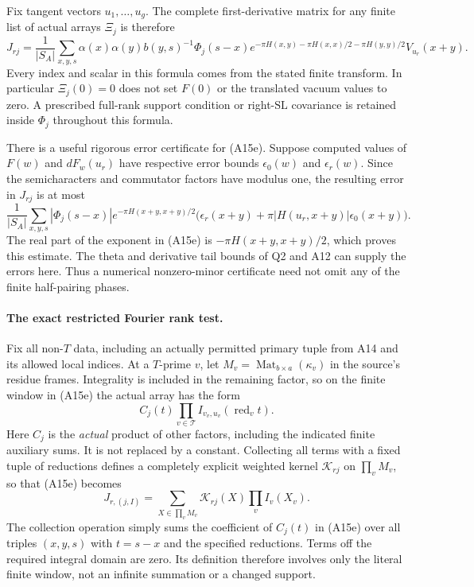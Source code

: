 Fix tangent vectors $u_1,\ldots,u_g$.  The complete first-derivative
matrix for any finite list of actual arrays $\Xi_j$ is therefore
\[
 J_{rj}=\frac1{|S_A|}
  \sum_{x,y,s}\alpha(x)\alpha(y)b(y,s)^{-1}
       \Phi_j(s-x)
       e^{-\pi H(x,y)-\pi H(x,x)/2-\pi H(y,y)/2}
       V_{u_r}(x+y).
 \tag{A15e}
\]
Every index and scalar in this formula comes from the stated finite
transform.  In particular $\Xi_j(0)=0$ does not set $F(0)$ or the
translated vacuum values to zero.  A prescribed full-rank support
condition or right-$\mathrm{SL}$ covariance is retained inside
$\Phi_j$ throughout this formula.

There is a useful rigorous error certificate for (A15e).  Suppose
computed values of $F(w)$ and $dF_w(u_r)$ have respective error bounds
$\epsilon_0(w)$ and $\epsilon_r(w)$.  Since the semicharacters and
commutator factors have modulus one, the resulting error in $J_{rj}$
is at most
\[
 \frac1{|S_A|}\sum_{x,y,s}|\Phi_j(s-x)|
 e^{-\pi H(x+y,x+y)/2}
 \bigl(\epsilon_r(x+y)+\pi|H(u_r,x+y)|\epsilon_0(x+y)\bigr).
 \tag{A15f}
\]
The real part of the exponent in (A15e) is
$-\pi H(x+y,x+y)/2$, which proves this estimate.  The theta and
derivative tail bounds of Q2 and A12 can supply the errors here.
Thus a numerical nonzero-minor certificate need not omit any of the
finite half-pairing phases.

\paragraph{The exact restricted Fourier rank test.}
Fix all non-$T$ data, including an actually permitted primary tuple
from A14 and its allowed local indices.  At a $T$-prime $v$, let
$M_v=\operatorname{Mat}_{b\times a}(\kappa_v)$ in the source's residue
frames.  Integrality is included in the remaining factor, so on the
finite window in (A15e) the actual array has the form
\[
 C_j(t)\prod_{v\in\mathcal T}I_{v_v,u_v}(\operatorname{red}_v t).
 \tag{A15g}
\]
Here $C_j$ is the \emph{actual} product of other factors, including
the indicated finite auxiliary sums.  It is not replaced by a
constant.  Collecting all terms with a fixed tuple of reductions
defines a completely explicit weighted kernel
$\mathcal K_{rj}$ on $\prod_v M_v$, so that (A15e) becomes
\[
 J_{r,(j,I)}=\sum_{X\in\prod_v M_v}
                    \mathcal K_{rj}(X)\prod_v I_v(X_v).
 \tag{A15h}
\]
The collection operation simply sums the coefficient of
$C_j(t)$ in (A15e) over all triples $(x,y,s)$ with $t=s-x$ and
the specified reductions.  Terms off the required integral domain
are zero.  Its definition therefore involves only the literal
finite window, not an infinite summation or a changed support.

